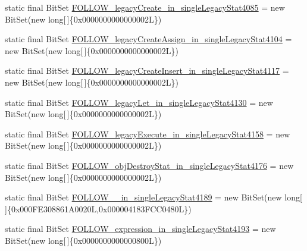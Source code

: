\begin{DoxyCompactItemize}
\item 
static final Bit\-Set \hyperlink{classorg_1_1tzi_1_1use_1_1parser_1_1testsuite_1_1_test_suite_parser_a2463926a9ed26aa7bb77fd414fd35bac}{F\-O\-L\-L\-O\-W\-\_\-legacy\-Create\-\_\-in\-\_\-single\-Legacy\-Stat4085} = new Bit\-Set(new long\mbox{[}$\,$\mbox{]}\{0x0000000000000002\-L\})
\item 
static final Bit\-Set \hyperlink{classorg_1_1tzi_1_1use_1_1parser_1_1testsuite_1_1_test_suite_parser_ae98b86ff01f43d6cfb2d5a4fd3a8c44d}{F\-O\-L\-L\-O\-W\-\_\-legacy\-Create\-Assign\-\_\-in\-\_\-single\-Legacy\-Stat4104} = new Bit\-Set(new long\mbox{[}$\,$\mbox{]}\{0x0000000000000002\-L\})
\item 
static final Bit\-Set \hyperlink{classorg_1_1tzi_1_1use_1_1parser_1_1testsuite_1_1_test_suite_parser_a75949b7e6e2c0075a008a67a333f65b0}{F\-O\-L\-L\-O\-W\-\_\-legacy\-Create\-Insert\-\_\-in\-\_\-single\-Legacy\-Stat4117} = new Bit\-Set(new long\mbox{[}$\,$\mbox{]}\{0x0000000000000002\-L\})
\item 
static final Bit\-Set \hyperlink{classorg_1_1tzi_1_1use_1_1parser_1_1testsuite_1_1_test_suite_parser_a3b4c80048f1871d3db5310622ff472e4}{F\-O\-L\-L\-O\-W\-\_\-legacy\-Let\-\_\-in\-\_\-single\-Legacy\-Stat4130} = new Bit\-Set(new long\mbox{[}$\,$\mbox{]}\{0x0000000000000002\-L\})
\item 
static final Bit\-Set \hyperlink{classorg_1_1tzi_1_1use_1_1parser_1_1testsuite_1_1_test_suite_parser_a4046c6a52d235d2d85d72367733bdea7}{F\-O\-L\-L\-O\-W\-\_\-legacy\-Execute\-\_\-in\-\_\-single\-Legacy\-Stat4158} = new Bit\-Set(new long\mbox{[}$\,$\mbox{]}\{0x0000000000000002\-L\})
\item 
static final Bit\-Set \hyperlink{classorg_1_1tzi_1_1use_1_1parser_1_1testsuite_1_1_test_suite_parser_aa52bedfb573ab57716f9116a1902b214}{F\-O\-L\-L\-O\-W\-\_\-obj\-Destroy\-Stat\-\_\-in\-\_\-single\-Legacy\-Stat4176} = new Bit\-Set(new long\mbox{[}$\,$\mbox{]}\{0x0000000000000002\-L\})
\item 
static final Bit\-Set \hyperlink{classorg_1_1tzi_1_1use_1_1parser_1_1testsuite_1_1_test_suite_parser_ae5e5bfcb0f708121910c6090dc8ad0f8}{F\-O\-L\-L\-O\-W\-\_\-\_\-in\-\_\-single\-Legacy\-Stat4189} = new Bit\-Set(new long\mbox{[}$\,$\mbox{]}\{0x000\-F\-E308861\-A0020\-L,0x000004183\-F\-C\-C0480\-L\})
\item 
static final Bit\-Set \hyperlink{classorg_1_1tzi_1_1use_1_1parser_1_1testsuite_1_1_test_suite_parser_a9cac673f75c94de00f6f23899f502865}{F\-O\-L\-L\-O\-W\-\_\-expression\-\_\-in\-\_\-single\-Legacy\-Stat4193} = new Bit\-Set(new long\mbox{[}$\,$\mbox{]}\{0x0000000000000800\-L\})

\end{DoxyCompactItemize}
